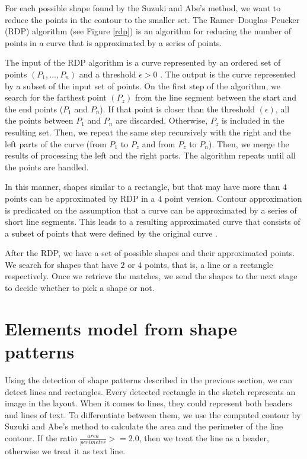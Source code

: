 \documentclass[]{IEEEtran}
\begin{document}
  For each possible shape found by the Suzuki and Abe's method, we want to reduce the points in the contour to the smaller set. The Ramer–Douglas–Peucker (RDP) algorithm (see Figure \ref{rdp}) is an algorithm for reducing the number of points in a curve that is approximated by a series of points.

  The input of the RDP algorithm is a curve represented by an ordered set of points $(P_1,\dots,P_n)$ and a threshold $\epsilon > 0$ . The output is the curve represented by a subset of the input set of points. On the first step of the algorithm, we search for the farthest point $(P_z)$ from the line segment between the start and the end points ($P_1$ and $P_n$). If that point is closer than the threshold $(\epsilon)$, all the points between $P_1$ and $P_n$ are discarded. Otherwise, $P_z$ is included in the resulting set. Then, we repeat the same step recursively with the right and the left parts of the curve (from $P_1$ to $P_z$ and from $P_z$ to $P_n$). Then, we merge the results of processing the left and the right parts. The algorithm repeats until all the points are handled.

  In this manner, shapes similar to a rectangle, but that may have more than $4$ points can be approximated by RDP in a $4$ point version. Contour approximation is predicated on the assumption that a curve can be approximated by a series of short line segments. This leads to a resulting approximated curve that consists of a subset of points that were defined by the original curve \cite{shape_detection}.

  After the RDP, we have a set of possible shapes and their approximated points. We search for shapes that have $2$ or $4$ points, that is, a line or a rectangle respectively. Once we retrieve the matches, we send the shapes to the next stage to decide whether to pick a shape or not.

  \section{Elements model from shape patterns}
  Using the detection of shape patterns described in the previous section, we can detect lines and rectangles. Every detected rectangle in the sketch represents an image in the layout. When it comes to lines, they could represent both headers and lines of text. To differentiate between them, we use the computed contour by Suzuki and Abe's method to calculate the area and the perimeter of the line contour. If the ratio $\frac{area}{perimeter} >= 2.0$, then we treat the line as a header, otherwise we treat it as text line.
\end{document}
